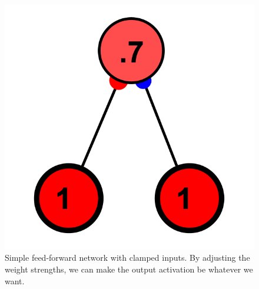 \begin{figure}[h]
\centering
\includegraphics[scale=.4]{./images/2-1_ff.png}
\caption[Simbrain screenshot.]{Simple feed-forward network with clamped inputs. By adjusting the weight strengths, we can make the output activation be whatever we want.}
\label{2NodeSimpleFF}
\end{figure}

